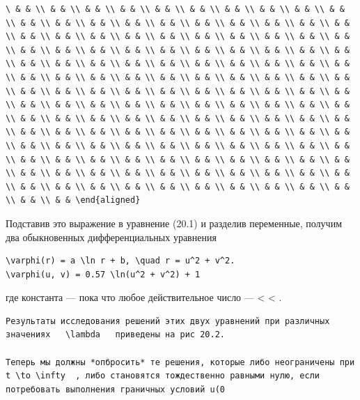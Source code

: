 \documentclass[
  ukrainian,
]{article}
\begin{document}
\begin{verbatim}
\ & & \\ & & \\ & & \\ & & \\ & & \\ & & \\ & & \\ & & \\ & & \\ & & \\ & & \\ & & \\ & & \\ & & \\ & & \\ & & \\ & & \\ & & \\ & & \\ & & \\ & & \\ & & \\ & & \\ & & \\ & & \\ & & \\ & & \\ & & \\ & & \\ & & \\ & & \\ & & \\ & & \\ & & \\ & & \\ & & \\ & & \\ & & \\ & & \\ & & \\ & & \\ & & \\ & & \\ & & \\ & & \\ & & \\ & & \\ & & \\ & & \\ & & \\ & & \\ & & \\ & & \\ & & \\ & & \\ & & \\ & & \\ & & \\ & & \\ & & \\ & & \\ & & \\ & & \\ & & \\ & & \\ & & \\ & & \\ & & \\ & & \\ & & \\ & & \\ & & \\ & & \\ & & \\ & & \\ & & \\ & & \\ & & \\ & & \\ & & \\ & & \\ & & \\ & & \\ & & \\ & & \\ & & \\ & & \\ & & \\ & & \\ & & \\ & & \\ & & \\ & & \\ & & \\ & & \\ & & \\ & & \\ & & \\ & & \\ & & \\ & & \\ & & \\ & & \\ & & \\ & & \\ & & \\ & & \\ & & \\ & & \\ & & \\ & & \\ & & \\ & & \\ & & \\ & & \\ & & \\ & & \\ & & \\ & & \\ & & \\ & & \\ & & \\ & & \\ & & \\ & & \\ & & \\ & & \\ & & \\ & & \\ & & \\ & & \\ & & \\ & & \\ & & \\ & & \\ & & \\ & & \\ & & \\ & & \\ & & \\ & & \\ & & \end{aligned}
\end{verbatim}

Подставив это выражение в уравнение (20.1) и разделив переменные,
получим два обыкновенных дифференциальных уравнения

\begin{verbatim}
\varphi(r) = a \ln r + b, \quad r = u^2 + v^2.
\varphi(u, v) = 0.57 \ln(u^2 + v^2) + 1
\end{verbatim}

где константа \lambda   --- пока что любое действительное число ---
\infty \textless{} \lambda \textless{} \infty   .

\begin{verbatim}
Результаты исследования решений этих двух уравнений при различных значениях   \lambda   приведены на рис 20.2.

Теперь мы должны *опбросить* те решения, которые либо неограничены при   t \to \infty  , либо становятся тождественно равными нулю, если потребовать выполнения граничных условий u(0
\end{verbatim}
\end{document}
